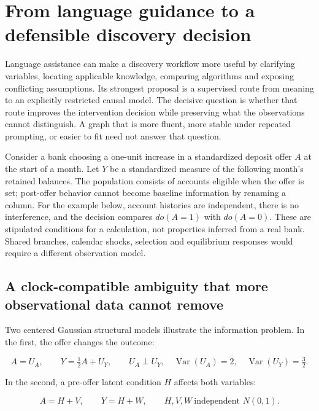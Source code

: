 \hypertarget{exec14:iid-discovery}{%
\section{From language guidance to a defensible discovery
decision}\label{exec14:iid-discovery}}

Language assistance can make a discovery workflow more useful by
clarifying variables, locating applicable knowledge, comparing
algorithms and exposing conflicting assumptions. Its strongest proposal
is a supervised route from meaning to an explicitly restricted causal
model. The decisive question is whether that route improves the
intervention decision while preserving what the observations cannot
distinguish. A graph that is more fluent, more stable under repeated
prompting, or easier to fit need not answer that question.

Consider a bank choosing a one-unit increase in a standardized deposit
offer \(A\) at the start of a month. Let \(Y\) be a standardized measure
of the following month's retained balances. The population consists of
accounts eligible when the offer is set; post-offer behavior cannot
become baseline information by renaming a column. For the example below,
account histories are independent, there is no interference, and the
decision compares \(do(A=1)\) with \(do(A=0)\). These are stipulated
conditions for a calculation, not properties inferred from a real bank.
Shared branches, calendar shocks, selection and equilibrium responses
would require a different observation model.

\hypertarget{a-clock-compatible-ambiguity-that-more-observational-data-cannot-remove}{%
\subsection{A clock-compatible ambiguity that more observational data
cannot
remove}\label{a-clock-compatible-ambiguity-that-more-observational-data-cannot-remove}}

Two centered Gaussian structural models illustrate the information
problem. In the first, the offer changes the outcome:

\[
 A=U_A,\qquad Y=\tfrac12 A+U_Y,\qquad
 U_A\perp U_Y,\quad
 \operatorname{Var}(U_A)=2,\quad\operatorname{Var}(U_Y)=\tfrac32.
\]

In the second, a pre-offer latent condition \(H\) affects both
variables:

\[
 A=H+V,\qquad Y=H+W,\qquad
 H,V,W\ \text{independent }N(0,1).
\]

